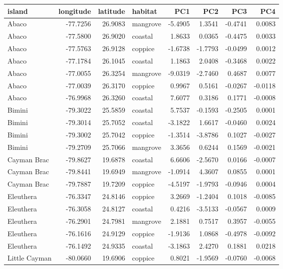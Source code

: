 
\begin{tabular}{l|r|r|l|r|r|r|r}
\hline
island & longitude & latitude & habitat & PC1 & PC2 & PC3 & PC4\\
\hline
Abaco & -77.7256 & 26.9083 & mangrove & -5.4905 & 1.3541 & -0.4741 & 0.0083\\
\hline
Abaco & -77.5800 & 26.9020 & coastal & 1.8633 & 0.0365 & -0.4475 & 0.0033\\
\hline
Abaco & -77.5763 & 26.9128 & coppice & -1.6738 & -1.7793 & -0.0499 & 0.0012\\
\hline
Abaco & -77.1784 & 26.1045 & coastal & 1.1863 & 2.0408 & -0.3468 & 0.0022\\
\hline
Abaco & -77.0055 & 26.3254 & mangrove & -9.0319 & -2.7460 & 0.4687 & 0.0077\\
\hline
Abaco & -77.0039 & 26.3170 & coppice & 0.9967 & 0.5161 & -0.0267 & -0.0118\\
\hline
Abaco & -76.9968 & 26.3260 & coastal & 7.6077 & 0.3186 & 0.1771 & -0.0008\\
\hline
Bimini & -79.3022 & 25.5859 & coastal & 5.7537 & -0.1593 & -0.2505 & 0.0001\\
\hline
Bimini & -79.3014 & 25.7052 & coastal & -3.1822 & 1.6617 & -0.0460 & 0.0024\\
\hline
Bimini & -79.3002 & 25.7042 & coppice & -1.3514 & -3.8786 & 0.1027 & -0.0027\\
\hline
Bimini & -79.2709 & 25.7066 & mangrove & 3.3656 & 0.6244 & 0.1569 & -0.0021\\
\hline
Cayman Brac & -79.8627 & 19.6878 & coastal & 6.6606 & -2.5670 & 0.0166 & -0.0007\\
\hline
Cayman Brac & -79.8441 & 19.6949 & mangrove & -1.0914 & 4.3607 & 0.0855 & 0.0001\\
\hline
Cayman Brac & -79.7887 & 19.7209 & coppice & -4.5197 & -1.9793 & -0.0946 & 0.0004\\
\hline
Eleuthera & -76.3347 & 24.8146 & coppice & 3.2669 & -1.2404 & 0.1018 & -0.0085\\
\hline
Eleuthera & -76.3058 & 24.8127 & coastal & 0.4216 & -3.5133 & -0.0567 & 0.0009\\
\hline
Eleuthera & -76.2901 & 24.7981 & mangrove & 2.1881 & 0.7517 & 0.3957 & -0.0055\\
\hline
Eleuthera & -76.1616 & 24.9129 & coppice & -1.9136 & 1.0868 & -0.4978 & -0.0092\\
\hline
Eleuthera & -76.1492 & 24.9335 & coastal & -3.1863 & 2.4270 & 0.1881 & 0.0218\\
\hline
Little Cayman & -80.0660 & 19.6906 & coppice & 0.8021 & -1.9569 & -0.0760 & -0.0068\\

\end{tabular}
